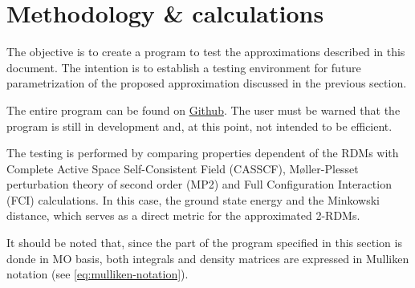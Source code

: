 \section{Methodology \& calculations} %
\label{sec:methodology-calculations}
The objective is to create a program to test the approximations described in
this document.
The intention is to establish a testing environment for future parametrization 
of the proposed approximation discussed in the previous section.

The entire program can be found on 
\href{https://github.com/jaqg/density-matrix}{Github}.
The user must be warned that the program is still in development and, at this
point, not intended to be efficient.

The testing is performed by comparing properties dependent of the
RDMs with Complete Active Space Self-Consistent Field (CASSCF),
Møller-Plesset perturbation theory of second order (MP2) and
Full Configuration Interaction (FCI) calculations.
In this case, the ground state energy and the Minkowski distance, which serves
as a direct metric for the approximated 2-RDMs.

It should be noted that, since the part of the program specified in this section
is donde in MO basis, both integrals and density matrices are expressed in
Mulliken notation (see \cref{eq:mulliken-notation}).
